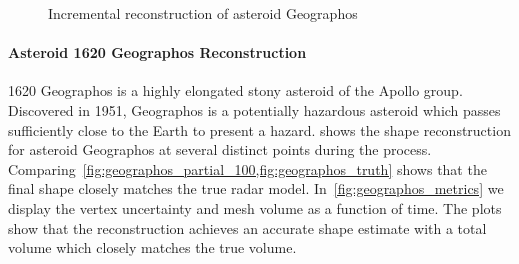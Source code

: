 \documentclass[journal]{new-aiaa}
\begin{document}
\begin{figure}[htbp]
    \caption[Asteroid Geographos incremental reconstruction]{Incremental reconstruction of asteroid Geographos~\label{fig:geographos_reconstruction}}
\end{figure}

\paragraph{Asteroid \num{1620} Geographos Reconstruction} 
\num{1620} Geographos is a highly elongated stony asteroid of the Apollo group.
Discovered in \num{1951}, Geographos is a potentially hazardous asteroid which passes sufficiently close to the Earth to present a hazard.
 shows the shape reconstruction for asteroid Geographos at several distinct points during the process.
Comparing~\cref{fig:geographos_partial_100,fig:geographos_truth} shows that the final shape closely matches the true radar model.
In~\cref{fig:geographos_metrics} we display the vertex uncertainty and mesh volume as a function of time.
The plots show that the reconstruction achieves an accurate shape estimate with a total volume which closely matches the true volume.
\end{document}
